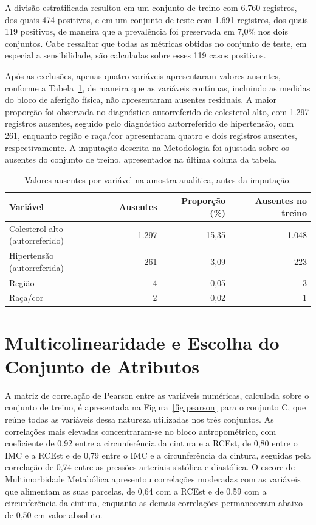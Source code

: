 A divisão estratificada resultou em um conjunto de treino com 6.760 registros, dos quais 474 positivos, e em um conjunto de teste com 1.691 registros, dos quais 119 positivos, de maneira que a prevalência foi preservada em 7,0\% nos dois conjuntos. Cabe ressaltar que todas as métricas obtidas no conjunto de teste, em especial a sensibilidade, são calculadas sobre esses 119 casos positivos.

Após as exclusões, apenas quatro variáveis apresentaram valores ausentes, conforme a Tabela~\ref{tab:ausentes}, de maneira que as variáveis contínuas, incluindo as medidas do bloco de aferição física, não apresentaram ausentes residuais. A maior proporção foi observada no diagnóstico autorreferido de colesterol alto, com 1.297 registros ausentes, seguido pelo diagnóstico autorreferido de hipertensão, com 261, enquanto região e raça/cor apresentaram quatro e dois registros ausentes, respectivamente. A imputação descrita na Metodologia foi ajustada sobre os ausentes do conjunto de treino, apresentados na última coluna da tabela.

\begin{table}[htb]
  \centering
  \caption{\label{tab:ausentes}Valores ausentes por variável na amostra analítica, antes da imputação.}
  \begin{tabular}{lrrr}
    \hline
    Variável & Ausentes & Proporção (\%) & Ausentes no treino \\ \hline
    Colesterol alto (autorreferido) & 1.297 & 15,35 & 1.048 \\
    Hipertensão (autorreferida) & 261 & 3,09 & 223 \\
    Região & 4 & 0,05 & 3 \\
    Raça/cor & 2 & 0,02 & 1 \\ \hline
  \end{tabular}
\end{table}

\section{Multicolinearidade e Escolha do Conjunto de Atributos}\label{sec:res-multicolinearidade}
A matriz de correlação de Pearson entre as variáveis numéricas, calculada sobre o conjunto de treino, é apresentada na Figura~\ref{fig:pearson} para o conjunto C, que reúne todas as variáveis dessa natureza utilizadas nos três conjuntos. As correlações mais elevadas concentraram-se no bloco antropométrico, com coeficiente de 0,92 entre a circunferência da cintura e a RCEst, de 0,80 entre o IMC e a RCEst e de 0,79 entre o IMC e a circunferência da cintura, seguidas pela correlação de 0,74 entre as pressões arteriais sistólica e diastólica. O escore de Multimorbidade Metabólica apresentou correlações moderadas com as variáveis que alimentam as suas parcelas, de 0,64 com a RCEst e de 0,59 com a circunferência da cintura, enquanto as demais correlações permaneceram abaixo de 0,50 em valor absoluto.

